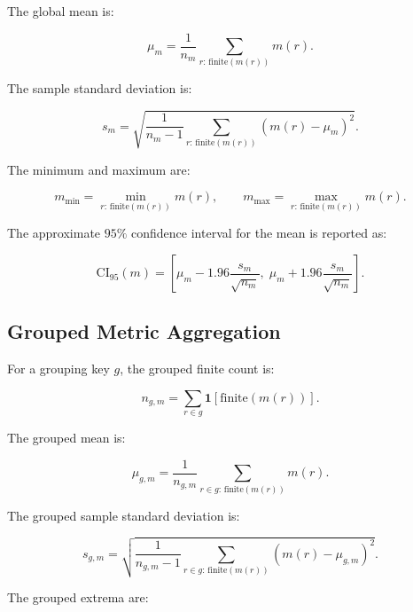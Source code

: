 The global mean is:

\begin{equation}
\mu_m
=
\frac{1}{n_m}
\sum_{r:\,\mathrm{finite}(m(r))}
m(r).
\end{equation}

The sample standard deviation is:

\begin{equation}
s_m
=
\sqrt{
\frac{1}{n_m - 1}
\sum_{r:\,\mathrm{finite}(m(r))}
\left(
m(r) - \mu_m
\right)^2
}.
\end{equation}

The minimum and maximum are:

\begin{equation}
m_{\min}
=
\min_{r:\,\mathrm{finite}(m(r))}
m(r),
\qquad
m_{\max}
=
\max_{r:\,\mathrm{finite}(m(r))}
m(r).
\end{equation}

The approximate $95\%$ confidence interval for the mean is reported as:

\begin{equation}
\mathrm{CI}_{95}(m)
=
\left[
\mu_m - 1.96 \frac{s_m}{\sqrt{n_m}},
\;
\mu_m + 1.96 \frac{s_m}{\sqrt{n_m}}
\right].
\end{equation}

\subsection{Grouped Metric Aggregation}
\label{subsec:grouped_aggregation}

For a grouping key $g$, the grouped finite count is:

\begin{equation}
n_{g,m}
=
\sum_{r \in g}
\mathbf{1}
\left[
\mathrm{finite}
\left(
m(r)
\right)
\right].
\end{equation}

The grouped mean is:

\begin{equation}
\mu_{g,m}
=
\frac{1}{n_{g,m}}
\sum_{r \in g:\,\mathrm{finite}(m(r))}
m(r).
\end{equation}

The grouped sample standard deviation is:

\begin{equation}
s_{g,m}
=
\sqrt{
\frac{1}{n_{g,m} - 1}
\sum_{r \in g:\,\mathrm{finite}(m(r))}
\left(
m(r)-\mu_{g,m}
\right)^2
}.
\end{equation}

The grouped extrema are:


